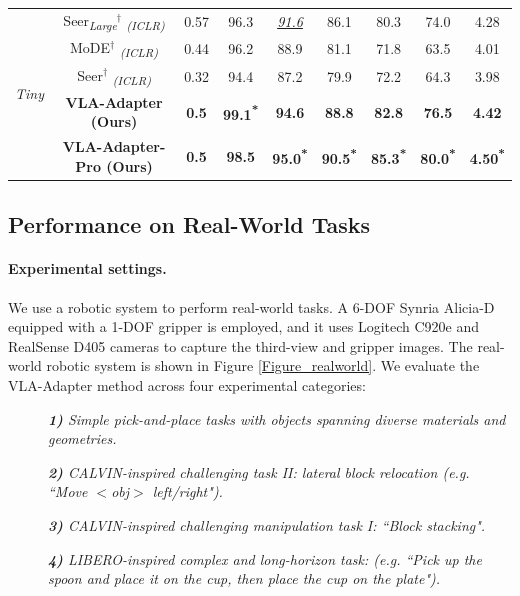 \begin{table}[!htbp]
\begin{tabular}{ccc|ccccc|c}
		\midrule[0.5pt]
		\multirow{5}{*}{\textit{Tiny}}&Seer\textsubscript{\textit{Large}}$^{\dag}$  \citep{Seer-2025} \textsubscript{\textit{(ICLR)}} &0.57& 96.3 & \underline{\textit{91.6}} & 86.1  & 80.3  & 74.0    & 4.28 \\
        &MoDE$^{\dag}$ \citep{MoDE-2025} \textsubscript{\textit{(ICLR)}} &0.44& 96.2  & 88.9  & 81.1  & 71.8  & 63.5  & 4.01 \\
		&Seer$^{\dag}$ \citep{Seer-2025} \textsubscript{\textit{(ICLR)}} &0.32& 94.4  & 87.2  & 79.9  & 72.2  & 64.3  & 3.98 \\	
		\rowcolor[rgb]{ .900,  .900,  .900}&\textbf{VLA-Adapter (Ours) }&\textbf{0.5}&\textbf{ 99.1\textsuperscript{*}} &\textbf{94.6}&\textbf{88.8}&\textbf{82.8}&\textbf{76.5}&\textbf{4.42} \\
        \rowcolor[rgb]{ .900,  .900,  .900}&\textbf{VLA-Adapter-Pro (Ours) }&\textbf{0.5}&\textbf{98.5} &\textbf{ 95.0\textsuperscript{*}}&\textbf{ 90.5\textsuperscript{*}}&\textbf{ 85.3\textsuperscript{*}}&\textbf{ 80.0\textsuperscript{*}}&\textbf{ 4.50\textsuperscript{*}} \\	
		\bottomrule[1pt]
	\end{tabular}%
\end{table}%

\subsection{Performance on Real-World Tasks}\label{sec44}


\paragraph{Experimental settings.}\label{sec441}
We use a robotic system to perform real-world tasks. A 6-DOF Synria Alicia-D equipped with a 1-DOF gripper is employed, and it uses Logitech C920e and RealSense D405 cameras to capture the third-view and gripper images. The real-world robotic system is shown in Figure \ref{Figure_realworld}. 
We evaluate the VLA-Adapter method across four experimental categories:

\begin{description}
    \item[] \thinspace \textit{\textbf{1)} Simple pick-and-place tasks with objects spanning diverse materials and geometries.}
	\item[] \thinspace \textit{\textbf{2)} CALVIN-inspired challenging task II: lateral block relocation (e.g. ``Move $<$obj$>$ left/right").}
    \item[] \thinspace \textit{\textbf{3)} CALVIN-inspired challenging manipulation task I: ``Block stacking".}
    \item[] \thinspace \textit{\textbf{4)} LIBERO-inspired complex and long-horizon task: (e.g. ``Pick up the spoon and place it on the cup, then place the cup on the plate").}  
\end{description}
%

